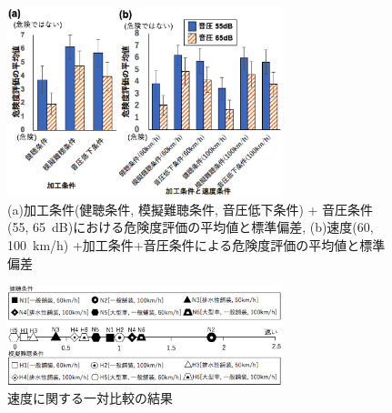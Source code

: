 \documentclass[10pt,twocolumn,uplatex,dvipdfmx]{jsarticle} %
\begin{document}

\begin{figure}[H]
  \begin{center}
      \includegraphics[width=8cm]{image/danger_result.eps}
      \caption{(a)加工条件(健聴条件, 模擬難聴条件, 音圧低下条件) + 音圧条件(55, 65~dB)における危険度評価の平均値と標準偏差, (b)速度(60, 100~km/h) +加工条件+音圧条件による危険度評価の平均値と標準偏差}
      \label{fig:danger_result}
  \end{center}
\end{figure}

\vspace{-12truemm}

\begin{figure}[H]
  \begin{center}
      \includegraphics[width=8cm]{image/speed_result.eps}
      \caption{速度に関する一対比較の結果}
      \label{fig:speed_result}
  \end{center}
\end{figure}
\end{document}
